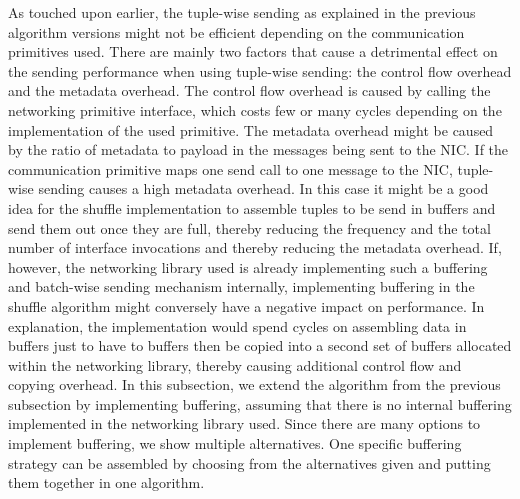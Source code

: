 As touched upon earlier, the tuple-wise sending as explained in the previous algorithm versions might not be efficient depending on the communication primitives used.
There are mainly two factors that cause a detrimental effect on the sending performance when using tuple-wise sending: the control flow overhead and the metadata overhead.
The control flow overhead is caused by calling the networking primitive interface, which costs few or many cycles depending on the implementation of the used primitive.
The metadata overhead might be caused by the ratio of metadata to payload in the messages being sent to the NIC.
If the communication primitive maps one send call to one message to the NIC, tuple-wise sending causes a high metadata overhead.
In this case it might be a good idea for the shuffle implementation to assemble tuples to be send in buffers and send them out once they are full, thereby reducing the frequency and the total number of interface invocations and thereby reducing the metadata overhead. 
If, however, the networking library used is already implementing such a buffering and batch-wise sending mechanism internally, implementing buffering in the shuffle algorithm might conversely have a negative impact on performance.
In explanation, the implementation would spend cycles on assembling data in buffers just to have to buffers then be copied into a second set of buffers allocated within the networking library, thereby causing additional control flow and copying overhead.
In this subsection, we extend the algorithm from the previous subsection by implementing buffering, assuming that there is no internal buffering implemented in the networking library used.
Since there are many options to implement buffering, we show multiple alternatives.
One specific buffering strategy can be assembled by choosing from the alternatives given and putting them together in one algorithm.

